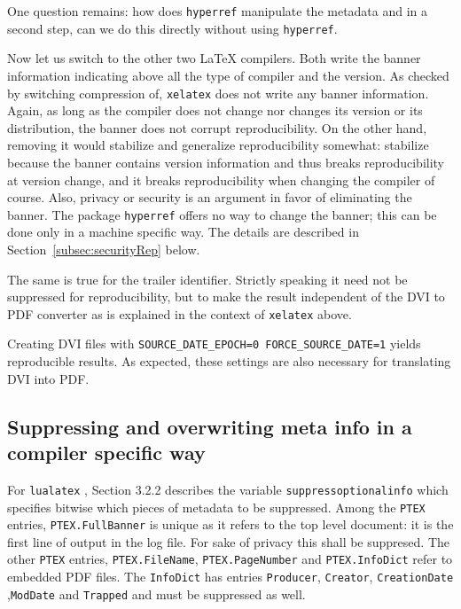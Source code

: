 \documentclass[a4paper, english]{article}%
\newcommand{\lualatex}{\texttt{lualatex}}
\newcommand{\xelatex}{\texttt{xelatex}}
\begin{document}
One question remains: how does \texttt{hyperref} manipulate the metadata 
and in a second step, can we do this directly without using \texttt{hyperref}. 
\medskip


Now let us switch to the other two \LaTeX{} compilers. 
Both write the banner information indicating 
above all the type of compiler and the version. 
As checked by switching compression of, \xelatex{} does not write any banner information. 
Again, as long as the compiler does not change nor changes its version or its distribution, 
the banner does not corrupt reproducibility. 
On the other hand, removing it would stabilize and generalize reproducibility somewhat: 
stabilize because the banner contains version information 
and thus breaks reproducibility at version change, 
and it breaks reproducibility when changing the compiler of course. 
Also, privacy or security is an argument in favor of eliminating the banner. 
The package \texttt{hyperref} offers no way to change the banner; 
this can be done only in a machine specific way. 
The details are described in Section~\ref{subsec:securityRep} below. 

The same is true for the trailer identifier. 
Strictly speaking it need not be suppressed for reproducibility, 
but to make the result independent of the DVI to PDF converter 
as is explained in the context of \xelatex{} above. 

Creating DVI files with \texttt{SOURCE\_DATE\_EPOCH=0 FORCE\_SOURCE\_DATE=1} 
yields reproducible results. 
As expected, these settings are also necessary for translating DVI into PDF\@. 

\subsection{Suppressing and overwriting meta info in a compiler specific way }

For \lualatex{} \cite{LuaTexRef24}, Section 3.2.2 describes the variable \texttt{suppressoptionalinfo} 
which specifies bitwise which pieces of metadata to be suppressed. 
Among the \texttt{PTEX} entries, \texttt{PTEX.FullBanner} is unique as it refers to the top level document: 
it is the first line of output in the log file. 
For sake of privacy this shall be suppresed. 
The other \texttt{PTEX} entries, 
\texttt{PTEX.FileName}, \texttt{PTEX.PageNumber} and \texttt{PTEX.InfoDict} 
refer to embedded PDF files. 
The \texttt{InfoDict} has entries \texttt{Producer}, \texttt{Creator}, \texttt{CreationDate} ,\texttt{ModDate} 
and \texttt{Trapped} and must be suppressed as well. 
\end{document}
